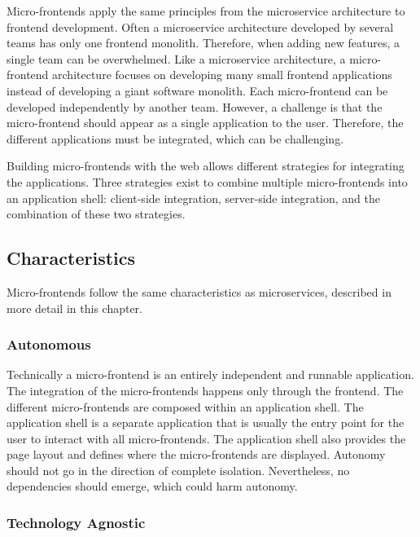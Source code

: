 \bigskip

\noindent Micro-frontends apply the same principles from the microservice architecture to frontend development. Often a microservice architecture developed by several teams has only one frontend monolith. Therefore, when adding new features, a single team can be overwhelmed. Like a microservice architecture, a micro-frontend architecture focuses on developing many small frontend applications instead of developing a giant software monolith. Each micro-frontend can be developed independently by another team. However, a challenge is that the micro-frontend should appear as a single application to the user. Therefore, the different applications must be integrated, which can be challenging.

\bigskip

\noindent Building micro-frontends with the web allows different strategies for integrating the applications. Three strategies exist to combine multiple micro-frontends into an application shell: client-side integration, server-side integration, and the combination of these two strategies. \cite[10-12]{book:2020:geers:background:micro-frontends:micro-frontends-in-action}

\subsection{Characteristics}

Micro-frontends follow the same characteristics as microservices, described in more detail in this chapter.

\subsubsection{Autonomous}

Technically a micro-frontend is an entirely independent and runnable application. The integration of the micro-frontends happens only through the frontend. The different micro-frontends are composed within an application shell. The application shell is a separate application that is usually the entry point for the user to interact with all micro-frontends. The application shell also provides the page layout and defines where the micro-frontends are displayed. Autonomy should not go in the direction of complete isolation. Nevertheless, no dependencies should emerge, which could harm autonomy. \cite{book:2020:geers:background:micro-frontends:micro-frontends-in-action}

\subsubsection{Technology Agnostic}

